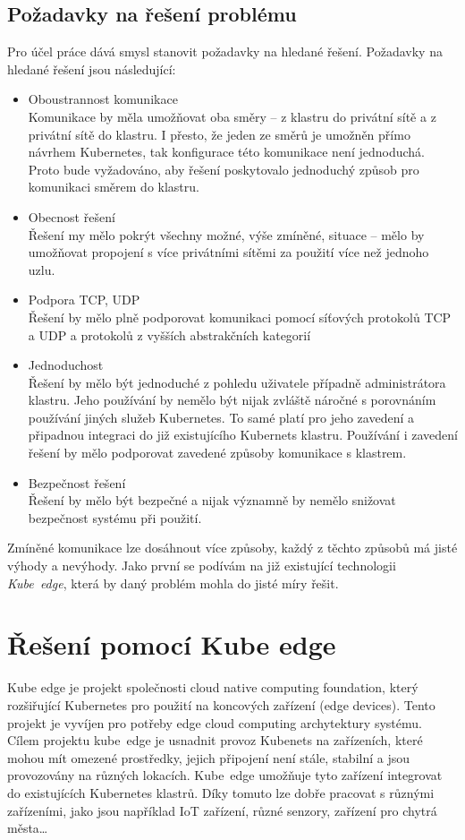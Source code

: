 \subsection{Požadavky na řešení problému}\label{sec:pozadavky}
Pro účel práce dává smysl stanovit požadavky na hledané řešení. Požadavky na hledané řešení jsou následující:
\begin{itemize}
    \item Oboustrannost komunikace\\
    Komunikace by měla umožňovat oba směry -- z klastru do privátní sítě a z privátní sítě do klastru. I přesto, že jeden ze směrů je umožněn přímo návrhem Kubernetes, tak konfigurace této komunikace není jednoduchá. Proto bude vyžadováno, aby řešení poskytovalo jednoduchý způsob pro komunikaci směrem do klastru.    
    \item Obecnost řešení\\
    Řešení my mělo pokrýt všechny možné, výše zmíněné, situace -- mělo by umožňovat propojení s více privátními sítěmi za použití více než jednoho uzlu.
    \item Podpora TCP, UDP\\
    Řešení by mělo plně podporovat komunikaci pomocí síťových protokolů TCP a UDP a protokolů z vyšších abstrakčních kategorií
    \item Jednoduchost\\
    Řešení by mělo být jednoduché z pohledu uživatele případně administrátora klastru. Jeho používání by nemělo být nijak zvláště náročné s porovnáním používání jiných služeb Kubernetes. To samé platí pro jeho zavedení a připadnou integraci do již existujícího Kubernets klastru. Používání i zavedení řešení by mělo podporovat zavedené způsoby komunikace s klastrem.
    \item Bezpečnost řešení\\
    Řešení by mělo být bezpečné a nijak významně by nemělo snižovat bezpečnost systému při použití.
\end{itemize}
\bigskip\medskip
Zmíněné komunikace lze dosáhnout více způsoby, každý z těchto způsobů má jisté výhody a nevýhody. Jako první se podívám na již existující technologii \textit{Kube~edge}, která by daný problém mohla do jisté míry řešit.
\section{Řešení pomocí Kube edge}
Kube edge je projekt společnosti cloud native computing foundation, který rozšiřující Kubernetes pro použití na koncových zařízení (edge devices). Tento projekt je vyvíjen pro potřeby edge cloud computing archytektury systému. \cite{bigelow_2021_what} Cílem projektu kube~edge je usnadnit provoz Kubenets na zařízeních, které mohou mít omezené prostředky, jejich připojení není stále, stabilní a jsou provozovány na různých lokacích. Kube~edge umožňuje tyto zařízení integrovat do existujících Kubernetes klastrů. Díky tomuto lze dobře pracovat s různými zařízeními, jako jsou například IoT zařízení, různé senzory, zařízení pro chytrá města\ldots \cite{kubeedgeprojectauthors_2023_kubeedge}

